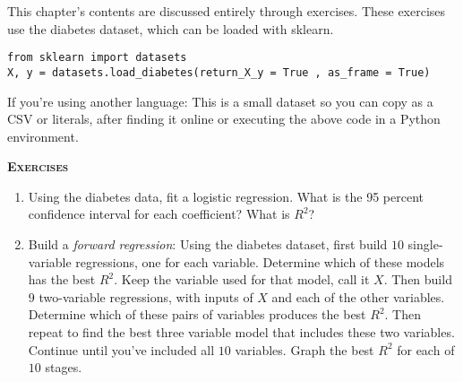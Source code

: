 \documentclass{amsbook}
\begin{document}
This chapter's contents are discussed entirely through exercises.  These exercises use the diabetes dataset, which can be loaded with sklearn.

\begin{lstlisting}
from sklearn import datasets
X, y = datasets.load_diabetes(return_X_y = True , as_frame = True)
\end{lstlisting}

If you're using another language:  This is a small dataset so you can copy as a CSV or literals, after finding it online or executing the above code in a Python environment.

{\bfseries\scshape\Large Exercises}

\begin{enumerate}
\item Using the diabetes data, fit a logistic regression.  What is the 95 percent confidence interval for each coefficient?  What is $R^2$?
\item Build a {\em forward regression}:  Using the diabetes dataset, first build $10$ single-variable regressions, one for each variable.  Determine which of these models has the best $R^2$.  Keep the variable used for that model, call it $X$.  Then build $9$ two-variable regressions, with inputs of $X$ and each of the other variables.  Determine which of these pairs of variables produces the best $R^2$.  Then repeat to find the best three variable model that includes these two variables.  Continue until you've included all $10$ variables.  Graph the best $R^2$ for each of $10$ stages.


\end{enumerate}
\end{document}
